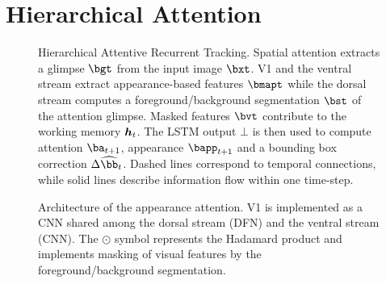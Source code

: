 \section{Hierarchical Attention}
\label{sec:att}


	\begin{figure}[ht]
		\centering
	 	\usebox{\systemfig}
	 	\caption{Hierarchical Attentive Recurrent Tracking. Spatial attention extracts a glimpse $\bgt$ from the input image $\bxt$. V1 and the ventral stream extract appearance-based features $\bmapt$ while the dorsal stream computes a foreground/background segmentation $\bst$ of the attention glimpse. Masked features $\bvt$ contribute to the working memory $\B{h}_t$. The LSTM output $\bot$ is then used to compute attention $\ba_{t+1}$, appearance $\bapp_{t+1}$ and a bounding box correction $\Delta \widehat{\bb}_t$. Dashed lines correspond to temporal connections, while solid lines describe information flow within one time-step.}
		\label{fig:system}
	\end{figure}
	

    \begin{SCfigure}[50]
		\usebox{\archfig}
		\caption{Architecture of the appearance attention. V1 is implemented as a CNN shared among the dorsal stream (DFN) and the ventral stream (CNN). The $\odot$ symbol represents the Hadamard product and implements masking of visual features by the foreground/background segmentation.}
		\label{fig:arch}
	\end{SCfigure}

